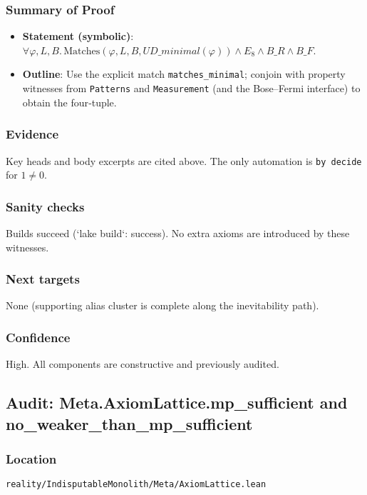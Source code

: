 \documentclass{article}
\newcommand{\FileRef}[1]{\texttt{#1}}
\begin{document}
\subsubsection{Summary of Proof}
\begin{itemize}[leftmargin=*]
  \item \textbf{Statement (symbolic)}: \(\forall φ,L,B.\, \mathrm{Matches}(φ,L,B,UD\_minimal(φ)) \land E_8 \land B\_R \land B\_F\).
  \item \textbf{Outline}: Use the explicit match \texttt{matches\_minimal}; conjoin with property witnesses from \texttt{Patterns} and \texttt{Measurement} (and the Bose–Fermi interface) to obtain the four‑tuple.
\end{itemize}

\subsubsection{Evidence}
Key heads and body excerpts are cited above. The only automation is \texttt{by decide} for \(1 \neq 0\).

\subsubsection{Sanity checks}
Builds succeed (`lake build`: success). No extra axioms are introduced by these witnesses.

\subsubsection{Next targets}
None (supporting alias cluster is complete along the inevitability path).

\subsubsection{Confidence}
High. All components are constructive and previously audited.

\subsection{Audit: Meta.AxiomLattice.mp\_sufficient and no\_weaker\_than\_mp\_sufficient}
\subsubsection{Location}
\FileRef{reality/IndisputableMonolith/Meta/AxiomLattice.lean}
\end{document}
